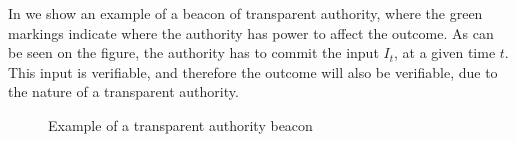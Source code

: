 In  we show an example of a beacon of transparent authority, where the green markings indicate where the authority has power to affect the outcome.
As can be seen on the figure, the authority has to commit the input $I_t$, at a given time $t$.
This input is verifiable, and therefore the outcome will also be verifiable, due to the nature of a transparent authority.


\begin{figure}[htb]
    \centering
    \footnotesize
    \caption{Example of a transparent authority beacon}\label{fig:transparent_beacon}
\end{figure}


